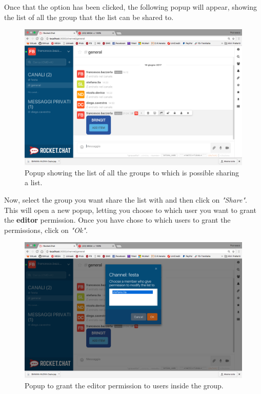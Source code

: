 Once that the option has been clicked, the following popup will appear, showing the list of all the group that the list can be shared to.

\begin{figure}[H]
  \centering 
  \includegraphics[width=\textwidth]{Sections/3-HowToUse/Images/share_group_channel.png}
  \caption{Popup showing the list of all the groups to which is possible sharing a list.}
\end{figure}

Now, select the group you want share the list with and then click on \textit{"Share"}. \\
This will open a new popup, letting you choose to which user you want to grant the \textbf{editor} permission. Once you have chose to which users to grant the permissions, click on \textit{"Ok"}.

\begin{figure}[H]
  \centering 
  \includegraphics[width=\textwidth]{Sections/3-HowToUse/Images/share_group_user.png}
  \caption{Popup to grant the editor permission to users inside the group.}
\end{figure}

